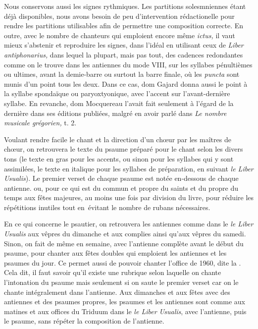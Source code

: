 \begin{frpars}
Nous conservons aussi les signes rythmiques. Les partitions solesmniennes étant déjà disponibles, nous avons besoin de peu d'intervention rédactionelle pour rendre les partitions utilisables afin de permettre une composition correcte. En outre, avec le nombre de chanteurs qui emploient encore même \textit{ictus,} il vaut mieux s'abstenir et reproduire les signes, dans l'idéal en utilisant ceux de \textit{Liber antiphonarius,} dans lequel la plupart, mais pas tout, des cadences redondantes comme on le trouve dans les antiennes du mode VIII, sur les syllabes pénultièmes ou ultimes, avant la demie-barre ou surtout la barre finale, où les \textit{puncta} sont munis d'un point tous les deux. Dans ce cas, dom Gajard donna aussi le point à la syllabe spondaïque ou paryoxtyonique, avec l'accent sur l'avant-dernière syllabe. En revanche, dom Mocquereau l'avait fait seulement à l'égard de la dernière dans ses éditions publiées, malgré en avoir parlé dans \textit{Le nombre musicale grégorien,} t. 2.

Voulant rendre facile le chant et la direction d'un chœur par les maîtres de chœur, on retrouvera le texte du psaume préparé pour le chant selon les divers tons (le texte en gras pour les accents, ou sinon pour les syllabes qui y sont assimilées, le texte en italique pour les syllabes de préparation, en suivant \textit{le Liber Usualis}). Le premier verset de chaque psaume est notée en-dessous de chaque antienne. ou, pour ce qui est du commun et propre du saints et du propre du temps aux fêtes majeures, au moins une fois par division du livre, pour réduire les répétitions inutiles tout en évitant le nombre de rubans nécessaires.

En ce qui concerne le psautier, on retrouvera les antiennes comme dans le \textit{le Liber Usualis} aux vêpres du dimanche et aux complies ainsi qu'aux vêpres du samedi. Sinon, on fait de même en semaine, avec l'antienne complète avant le début du psaume, pour chanter aux fêtes doubles qui emploient les antiennes et les psaumes du jour. Ce permet aussi de pouvoir chanter l'office de 1960, dite la . Cela dit, il faut savoir qu'il existe une rubrique selon laquelle on chante l'intonation du psaume mais seulement si on saute le premier verset car on le chante intégralement dans l'antienne. Aux dimanches et aux fêtes avec des antiennes et des psaumes propres, les psaumes et les antiennes sont comme aux matines et aux offices du Triduum dans le \textit{le Liber Usualis}, avec l'antienne, puis le psaume, sans répéter la composition de l'antienne.


\end{frpars}
